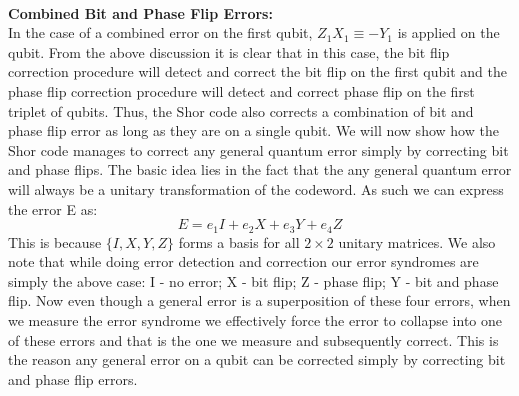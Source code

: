 \documentclass[12pt]{report}
\begin{document}
\\
\textbf{Combined Bit and Phase Flip Errors:} \\
In the case of a combined error on the first qubit, $Z_1X_1 \equiv -Y_1$ is applied on the qubit. From the above discussion it is clear that in this case, the bit flip correction procedure will detect and correct the bit flip on the first qubit and the phase flip correction procedure will detect and correct phase flip on the first triplet of qubits. Thus, the Shor code also corrects a combination of bit and phase flip error as long as they are on a single qubit. We will now show how the Shor code manages to correct any general quantum error simply by correcting bit and phase flips. The basic idea lies in the fact that the any general quantum error will always be a unitary transformation of the codeword. As such we can express the error E as: \\ 
			\begin{equation}E = e_1I + e_2X + e_3Y + e_4Z\end{equation}
This is because $\{I, X, Y, Z\}$ forms a basis for all $2 \times 2$ unitary matrices. We also note that while doing error detection and correction our error syndromes are simply the above case: I - no error; X - bit flip; Z - phase flip; Y - bit and phase flip. Now even though a general error is a superposition of these four errors, when we measure the error syndrome we effectively force the error to collapse into one of these errors and that is the one we measure and subsequently correct. This is the reason any general error on a qubit can be corrected simply by correcting bit and phase flip errors. 
\end{document}
